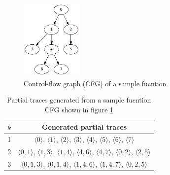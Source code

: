 
\begin{figure}[!ht]
	\centering
	\includegraphics[height=4cm, width=3cm]{srj-figures/tracelet.png}
	\caption{Control-flow graph (CFG) of a sample fucntion}\label{fig:tracelet}
\end{figure}

\begin{table}[!ht]
\caption{Partial traces generated from a sample fucntion CFG shown in figure \ref{fig:tracelet}}\label{tab:par_tra}
\begin{center}
{\scriptsize
\begin{tabular}{|c|c|}
  \hline
  \textbf{$k$} & \textbf{Generated partial traces} \\
  \hline
  1 & $\langle 0 \rangle$, $\langle 1 \rangle$, $\langle 2 \rangle$, $\langle 3 \rangle$, $\langle4\rangle$, $\langle 5 \rangle$, $\langle 6 \rangle$, $\langle 7 \rangle$\\
  \hline
  2 & $\langle 0,1 \rangle$, $\langle 1,3 \rangle$, $\langle 1,4 \rangle$, $\langle 4,6 \rangle$, $\langle 4,7 \rangle$, $\langle 0,2 \rangle$, $\langle 2,5 \rangle$\\
  \hline
  3 & $\langle 0,1,3 \rangle$, $\langle 0,1,4 \rangle$, $\langle 1,4,6 \rangle$, $\langle 1,4,7 \rangle$, $\langle 0,2,5 \rangle$\\
  \hline
  \end{tabular}
}
\end{center}
\end{table}

